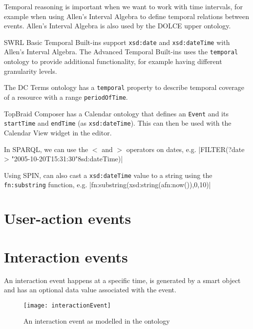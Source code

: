 Temporal reasoning is important when we want to work with time intervals, for example when using Allen's Interval Algebra to define temporal relations between events. Allen's Interval Algebra is also used by the \ac{DOLCE} \cite{Scherp2011} upper ontology. 

\ac{SWRL} Basic Temporal Built-ins support \texttt{xsd:date} and \texttt{xsd:dateTime} with Allen's Interval Algebra. The Advanced Temporal Built-ins uses the \texttt{temporal} ontology \cite{OConnor2010} to provide additional functionality, for example having different granularity levels.


The \ac{DC} Terms ontology has a \texttt{temporal} property to describe temporal coverage of a resource with a range \texttt{periodOfTime}.

TopBraid Composer has a Calendar ontology that defines an \texttt{Event} and its \texttt{startTime} and \texttt{endTime} (as \texttt{xsd:dateTime}). This can then be used with the Calendar View widget in the editor. 

In \ac{SPARQL}, we can use the $<$ and $>$ operators on dates, e.g. |FILTER(?date > "2005-10-20T15:31:30"^^xsd:dateTime)|

Using \ac{SPIN}, can also cast a \texttt{xsd:dateTime} value to a string using the \texttt{fn:substring} function, e.g. |fn:substring(xsd:string(afn:now()),0,10)|




\section{User-action events}









\section{Interaction events}
An interaction event happens at a specific time, is generated by a smart object and has an optional data value associated with the event.

\begin{figure}[bth]
        \texttt{[image: interactionEvent]}
        \caption{An interaction event as modelled in the ontology}
        \label{interactionEvent}
\end{figure}

